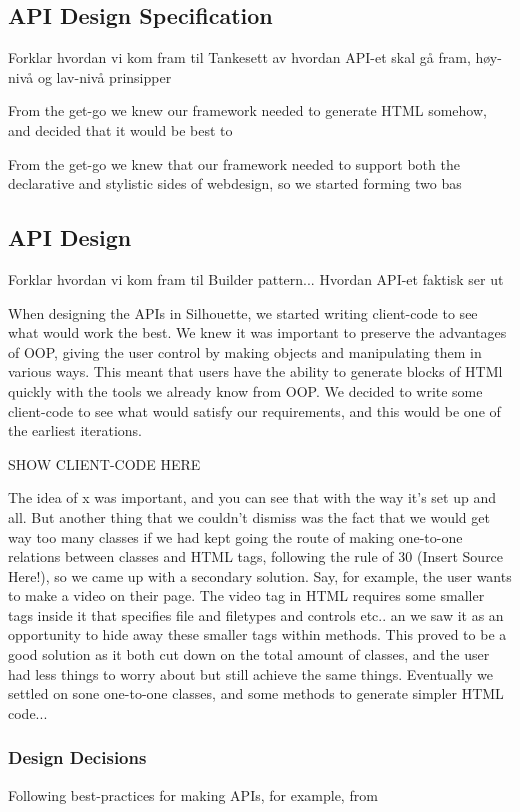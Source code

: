 \documentclass[12pt]{article}
\begin{document}
    \subsection{API Design Specification}
    Forklar hvordan vi kom fram til Tankesett av hvordan API-et skal gå fram, høy-nivå og lav-nivå prinsipper

    From the get-go we knew our framework needed to generate HTML somehow, and decided that it would be best to 

    From the get-go we knew that our framework needed to support both the declarative and stylistic sides of webdesign, so we started forming two bas
    

    \subsection{API Design}
    Forklar hvordan vi kom fram til Builder pattern... Hvordan API-et faktisk ser ut

    When designing the APIs in Silhouette, we started writing client-code to see what would work the best. We knew it was important to preserve the advantages of OOP, giving the user control by making objects and manipulating them in various ways. This meant that users have the ability to generate blocks of HTMl quickly with the tools we already know from OOP. We decided to write some client-code to see what would satisfy our requirements, and this would be one of the earliest iterations.

    SHOW CLIENT-CODE HERE
    
    The idea of x was important, and you can see that with the way it's set up and all. But another thing that we couldn't dismiss was the fact that we would get way too many classes if we had kept going the route of making one-to-one relations between classes and HTML tags, following the rule of 30 (Insert Source Here!), so we came up with a secondary solution. Say, for example, the user wants to make a video on their page. The video tag in HTML requires some smaller tags inside it that specifies file and filetypes and controls etc.. an we saw it as an opportunity to hide away these smaller tags within methods. This proved to be a good solution as it both cut down on the total amount of classes, and the user had less things to worry about but still achieve the same things. Eventually we settled on sone one-to-one classes, and some methods to generate simpler HTML code...
    
        \subsubsection{Design Decisions}
        Following best-practices for making APIs, for example, from     
\end{document}
